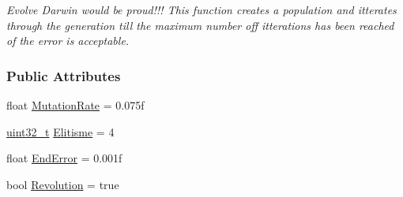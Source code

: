 \begin{DoxyCompactItemize}
\begin{DoxyCompactList}\small\item\em Evolve Darwin would be proud!!! This function creates a population and itterates through the generation till the maximum number off itterations has been reached of the error is acceptable. \end{DoxyCompactList}\end{DoxyCompactItemize}
\subsubsection*{Public Attributes}
\begin{DoxyCompactItemize}
\item 
float \hyperlink{class_soil_math_1_1_g_a_a82996d544a2f25b5a75ae8ba1e82d661}{Mutation\+Rate} = 0.\+075f
\item 
\hyperlink{_soil_math_types_8h_a435d1572bf3f880d55459d9805097f62}{uint32\+\_\+t} \hyperlink{class_soil_math_1_1_g_a_a381e62f146aacfa86fec6e0dc40053ab}{Elitisme} = 4
\item 
float \hyperlink{class_soil_math_1_1_g_a_ad5d1226dba5df72a3419e9af62f4e9d9}{End\+Error} = 0.\+001f
\item 
bool \hyperlink{class_soil_math_1_1_g_a_a2f3a405dfd8e11eecf581e66e7418d40}{Revolution} = true
\end{DoxyCompactItemize}
